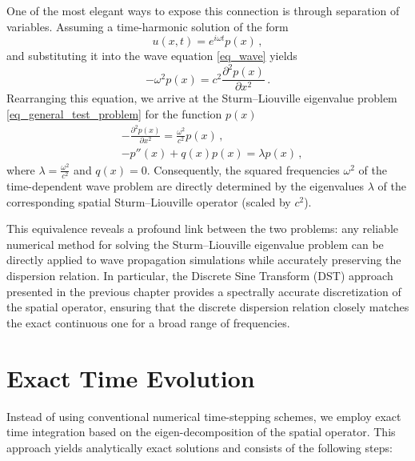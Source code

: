 \documentclass[11pt,a4paper,oneside,openright]{report} %
\begin{document}
One of the most elegant ways to expose this connection is through separation of variables. Assuming a time-harmonic solution of the form
\begin{equation}
    u(x,t) = e^{i \omega t} p(x) \, ,
\end{equation}
and substituting it into the wave equation \eqref{eq_wave} yields
\begin{equation}
    -\omega^2 p(x) = c^2 \frac{\partial^2 p(x)}{\partial x^2} \, .
\end{equation}
Rearranging this equation, we arrive at the Sturm--Liouville eigenvalue problem \eqref{eq_general_test_problem} for the function $p(x)$
\begin{subequations}
    \begin{align}
       & - \frac{\partial^2 p(x)}{\partial x^2} = \frac{\omega^2}{c^2} p(x) \, , \\[5pt]
       & - p''(x) + q(x) p(x) = \lambda p(x) \, ,
    \end{align}
\end{subequations}
where $\lambda = \frac{\omega^2}{c^2}$ and $q(x)=0$. Consequently, the squared frequencies $\omega^2$ of the time-dependent wave problem are directly determined by the eigenvalues $\lambda$ of the corresponding spatial Sturm--Liouville operator (scaled by $c^2$).

This equivalence reveals a profound link between the two problems: any reliable numerical method for solving the Sturm--Liouville eigenvalue problem can be directly applied to wave propagation simulations while accurately preserving the dispersion relation. In particular, the Discrete Sine Transform (DST) approach presented in the previous chapter provides a spectrally accurate discretization of the spatial operator, ensuring that the discrete dispersion relation closely matches the exact continuous one for a broad range of frequencies.




\section{Exact Time Evolution}
\noindent
Instead of using conventional numerical time-stepping schemes, we employ exact time integration based on the eigen-decomposition of the spatial operator. This approach yields analytically exact solutions and consists of the following steps:
\end{document}
